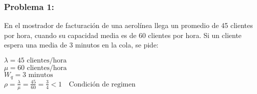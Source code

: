 \documentclass{templateNote}
\begin{document}
\subsubsection{Problema 1:}
En el mostrador de facturaci\'on de una aerol\'inea llega un promedio de 45 clientes por hora, cuando su capacidad media es de 60 clientes por hora.
Si un cliente espera una media de 3 minutos en la cola, se pide:
\begin{tcolorbox}[
    colframe=Celeste!100, %
    colback=Celeste!20,       %
    coltitle=white!100, %
    title=\textbf{Datos}, %
]
        $\lambda = 45 \text{ clientes/hora}$ \\
        $\mu = 60 \text{ clientes/hora}$ \\
        $W_q = 3 \text{ minutos}$ \\
        $\rho = \frac{\lambda}{\mu} = \frac{45}{60} = \frac{3}{4} < 1 \quad \text{Condici\'on de regimen}$
\end{tcolorbox}
\end{document}

